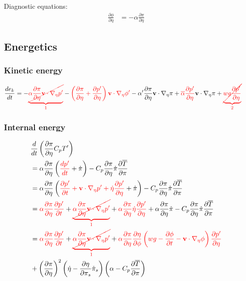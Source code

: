 \documentclass[12pt]{article}
\renewcommand{\d}[2]{\frac{d #1}{d #2}}
\newcommand{\dt}[1]{\d{#1}{t}}
\newcommand{\pd}[2]{\frac{\partial #1}{\partial #2}}
\newcommand{\pdt}[1]{\pd{#1}{t}}
\renewcommand{\vec}[1]{\mathbf{#1}}
\newcommand{\grad}[2][\pi]{\nabla_{#1} #2}
\begin{document}
Diagnostic equations:
\begin{align*}
  \pd{\phi}{\eta} & = - \alpha \pd{\pi}{\eta}
\end{align*}

\subsection{Energetics}

\subsubsection{Kinetic energy}
\begin{align*}
  \dt{e_k} & = - {\color{red}\underbrace{\cancel{\alpha \pd{\pi}{\eta} \vec{v} \cdot \grad[\eta]{p^\prime}}}_1} - {\color{red}\left(\pd{\pi}{\eta} + \pd{p^\prime}{\eta}\right) \vec{v} \cdot \grad[\eta]{\phi^\prime}} - \alpha^\prime \pd{\pi}{\eta} \vec{v} \cdot \grad[\eta]{\pi} + {\color{red}\overline{\alpha} \pd{p^\prime}{\eta}} \vec{v} \cdot \grad[\eta]{\pi} + {\color{red}\underbrace{\cancel{w g \pd{p^\prime}{\eta}}}_2}
\end{align*}

\subsubsection{Internal energy}

\begin{align*}
  & \dt{} \left(\pd{\pi}{\eta} C_p T^\prime\right) \\
  & = \alpha \pd{\pi}{\eta} \left({\color{red}\dt{p^\prime}} + \dot{\pi}\right) - C_p \pd{\pi}{\eta} \dot{\pi} \pd{\overline{T}}{\pi} \\
  & = \alpha \pd{\pi}{\eta} \left({\color{red}\pdt{p^\prime} + \vec{v} \cdot \grad[\eta]{p^\prime} + \dot{\eta} \pd{p^\prime}{\eta}} + \dot{\pi}\right) - C_p \pd{\pi}{\eta} \dot{\pi} \pd{\overline{T}}{\pi} \\
  & = {\color{red}\alpha \pd{\pi}{\eta} \pdt{p^\prime}} + {\color{red}\underbrace{\cancel{\alpha \pd{\pi}{\eta} \vec{v} \cdot \grad[\eta]{p^\prime}}}_1} + {\color{red}\alpha \pd{\pi}{\eta} \dot{\eta} \pd{p^\prime}{\eta}} + \alpha \pd{\pi}{\eta} \dot{\pi} - C_p \pd{\pi}{\eta} \dot{\pi} \pd{\overline{T}}{\pi} \\
  & = {\color{red}\alpha \pd{\pi}{\eta} \pdt{p^\prime}} + {\color{red}\underbrace{\cancel{\alpha \pd{\pi}{\eta} \vec{v} \cdot \grad[\eta]{p^\prime}}}_1} + {\color{red}\alpha \pd{\pi}{\eta} \pd{\eta}{\phi} \left(w g - \pdt{\phi} - \vec{v} \cdot \grad[\eta]{\phi}\right) \pd{p^\prime}{\eta}} \\
  & + \left(\pd{\pi}{\eta}\right)^2 \left(\dot{\eta} - \pd{\eta}{\pi_s} \dot{\pi}_s\right) \left(\alpha - C_p \pd{\overline{T}}{\pi}\right)
\end{align*}
\end{document}
